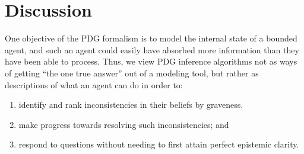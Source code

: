 \documentclass{article}
\theoremstyle{plain}
\theoremstyle{definition}
\theoremstyle{remark}
\begin{document}
\section{Discussion}

%
%
One objective of the PDG formalism is to model the internal state of a bounded agent, and such an agent could easily have absorbed more information than they have been able to process.
Thus, we view PDG inference algorithms not as ways of getting ``the one true answer'' out of a modeling tool, but rather as descriptions of what an agent can do in order to:
\begin{enumerate}[nosep]
	\item identify and rank inconsistencies in their beliefs by graveness.
	\item make progress towards resolving such inconsistencies; and
	\item respond to questions without needing to first attain perfect epistemic clarity.
\end{enumerate}



\clearpage
\appendix
\end{document}
